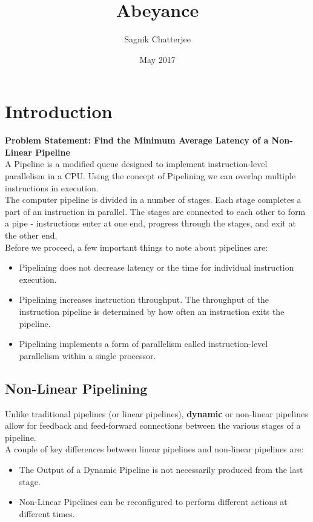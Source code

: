 \documentclass{article}
\title{Abeyance}
\author{Sagnik Chatterjee}
\date{May 2017}
\begin{document}
\maketitle

\section{Introduction}

\textbf{Problem Statement: Find the Minimum Average Latency of a Non-Linear Pipeline}\\
A Pipeline is a modified queue designed to implement instruction-level parallelism in a CPU. Using the concept of Pipelining we can overlap multiple instructions in execution.\\
The computer pipeline is divided in a number of stages. Each stage completes a part of an instruction in parallel. The stages are connected to each other to form a pipe - instructions enter at one end, progress through the stages, and exit at the other end.\\
Before we proceed, a few important things to note about pipelines are:
\begin{itemize}
    \item Pipelining does not decrease latency or the time for individual instruction execution.
    \item Pipelining increases instruction throughput. The throughput of the instruction pipeline is determined by how often an instruction exits the pipeline.
	\item Pipelining implements a form of parallelism called instruction-level parallelism within a single processor.
\end{itemize}

\subsection{Non-Linear Pipelining}

Unlike traditional pipelines (or linear pipelines), \textbf{dynamic} or non-linear pipelines allow for feedback and feed-forward connections between the various stages of a pipeline.\\
A couple of key differences between linear pipelines and non-linear pipelines are:
\begin{itemize}
    \item The Output of a Dynamic Pipeline is not necessarily produced from the last stage.
    \item Non-Linear Pipelines can be reconfigured to perform different actions at different times.
\end{itemize}
\end{document}
